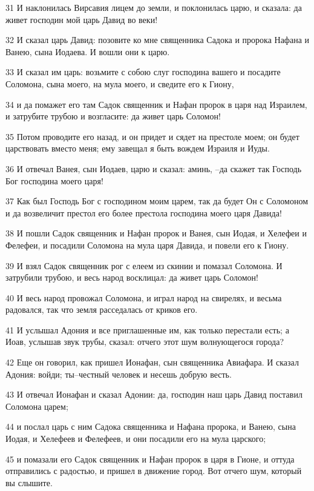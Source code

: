 \par 31 И наклонилась Вирсавия лицем до земли, и поклонилась царю, и сказала: да живет господин мой царь Давид во веки!
\par 32 И сказал царь Давид: позовите ко мне священника Садока и пророка Нафана и Ванею, сына Иодаева. И вошли они к царю.
\par 33 И сказал им царь: возьмите с собою слуг господина вашего и посадите Соломона, сына моего, на мула моего, и сведите его к Гиону,
\par 34 и да помажет его там Садок священник и Нафан пророк в царя над Израилем, и затрубите трубою и возгласите: да живет царь Соломон!
\par 35 Потом проводите его назад, и он придет и сядет на престоле моем; он будет царствовать вместо меня; ему завещал я быть вождем Израиля и Иуды.
\par 36 И отвечал Ванея, сын Иодаев, царю и сказал: аминь, --да скажет так Господь Бог господина моего царя!
\par 37 Как был Господь Бог с господином моим царем, так да будет Он с Соломоном и да возвеличит престол его более престола господина моего царя Давида!
\par 38 И пошли Садок священник и Нафан пророк и Ванея, сын Иодая, и Хелефеи и Фелефеи, и посадили Соломона на мула царя Давида, и повели его к Гиону.
\par 39 И взял Садок священник рог с елеем из скинии и помазал Соломона. И затрубили трубою, и весь народ восклицал: да живет царь Соломон!
\par 40 И весь народ провожал Соломона, и играл народ на свирелях, и весьма радовался, так что земля расседалась от криков его.
\par 41 И услышал Адония и все приглашенные им, как только перестали есть; а Иоав, услышав звук трубы, сказал: отчего этот шум волнующегося города?
\par 42 Еще он говорил, как пришел Ионафан, сын священника Авиафара. И сказал Адония: войди; ты--честный человек и несешь добрую весть.
\par 43 И отвечал Ионафан и сказал Адонии: да, господин наш царь Давид поставил Соломона царем;
\par 44 и послал царь с ним Садока священника и Нафана пророка, и Ванею, сына Иодая, и Хелефеев и Фелефеев, и они посадили его на мула царского;
\par 45 и помазали его Садок священник и Нафан пророк в царя в Гионе, и оттуда отправились с радостью, и пришел в движение город. Вот отчего шум, который вы слышите.
